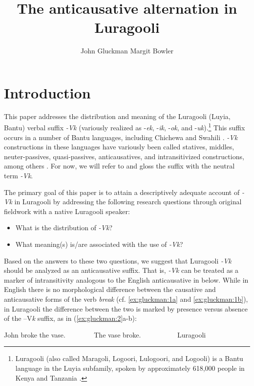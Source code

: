 \documentclass[output=paper]{langsci/langscibook}
\title{The anticausative alternation in Luragooli}
\author{%
 John Gluckman\affiliation{UCLA}\lastand 
 Margit Bowler \affiliation{UCLA}
}
\begin{document}
\section{Introduction}\label{sec:gluckman:1}

This paper addresses the distribution and meaning of the Luragooli (Luyia, Bantu) verbal suffix \textit{-Vk} (variously realized as -\textit{ek}, -\textit{ik}, -\textit{ok}, and -\textit{uk}).\footnote{Luragooli (also called Maragoli, Logoori, Lulogoori, and Logooli) is a Bantu language in the Luyia subfamily, spoken by approximately 618,000 people in Kenya and Tanzania \citep{LewisEtAl2015}.} This suffix occurs in a number of Bantu languages, including Chichewa \citep{Mchombo1993,Simango2009} and Swahili \citep{SeidlDimitriadis2003}. \textit{-Vk} constructions in these languages have variously been called statives, middles, neuter-passives, quasi-passives, anticausatives, and intransitivized constructions, among others \citep{Mchombo1993,Dubinsky1996,SeidlDimitriadis2003,Fernando2013}. For now, we will refer to and gloss the suffix with the neutral term \textit{-Vk}.

The primary goal of this paper is to attain a descriptively adequate account of \textit{-Vk} in Luragooli by addressing the following research questions through original fieldwork with a native Luragooli speaker:

\begin{itemize}
\item What is the distribution of \textit{-Vk}?
\item What meaning(s) is/are associated with the use of \textit{-Vk}?
\end{itemize}

Based on the answers to these two questions, we suggest that Luragooli \textit{-Vk} should be analyzed as an anticausative suffix. That is, \textit{-Vk} can be treated as a marker of intransitivity analogous to the English anticausative in  below. While in English there is no morphological difference between the causative and anticausative forms of the verb \textit{break} (cf. \ref{ex:gluckman:1a} and \ref{ex:gluckman:1b}), in Luragooli the difference between the two is marked by presence versus absence of the –V\textit{k} suffix, as in (\ref{ex:gluckman:2}a-b):


\ea\label{ex:gluckman:1} 
\ea\label{ex:gluckman:1a} 
   John broke the vase.~ ~ ~ ~ ~       
 \ex \label{ex:gluckman:1b} 
 The vase broke. ~ ~ ~ ~ ~ ~       
 \z
\z
{}
\ea\label{ex:gluckman:2}{Luragooli}{}{}\\
\ea \label{ex:gluckman:2a}
 
\end{document}
